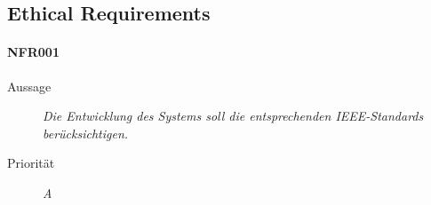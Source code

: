 \subsection{Ethical Requirements}


\paragraph{NFR001}
\begin{description}
  \item[Aussage] \textit{Die Entwicklung des Systems soll die entsprechenden IEEE-Standards ber\"ucksichtigen.}
  \item[Priorit\"at] \textit{A}
\end{description}